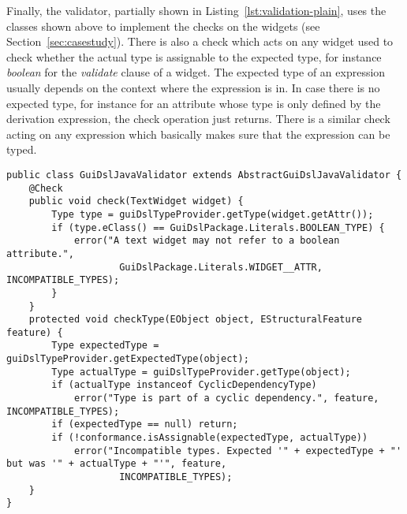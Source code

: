 Finally, the validator, partially shown in Listing~\ref{lst:validation-plain},
uses the classes shown above to implement the checks on the widgets (see
Section~\ref{sec:casestudy}).
There is also a check which acts on any widget used to check whether the actual
type is assignable to the expected type, for instance \emph{boolean} for the
\emph{validate} clause of a widget. The expected type of an expression usually
depends on the context where the expression is in.
In case there is no expected type, for instance for an attribute whose type is
only defined by the derivation expression, the check operation just returns.
There is a similar check acting on any expression which basically makes sure
that the expression can be typed.

%

\begin{lstlisting}[float=tb,label=lst:validation-plain,caption=Xtext validator.] 
public class GuiDslJavaValidator extends AbstractGuiDslJavaValidator {
	@Check
	public void check(TextWidget widget) {
		Type type = guiDslTypeProvider.getType(widget.getAttr());
		if (type.eClass() == GuiDslPackage.Literals.BOOLEAN_TYPE) {
			error("A text widget may not refer to a boolean attribute.",
					GuiDslPackage.Literals.WIDGET__ATTR, INCOMPATIBLE_TYPES);
		}
	}
	protected void checkType(EObject object, EStructuralFeature feature) {
		Type expectedType = guiDslTypeProvider.getExpectedType(object);
		Type actualType = guiDslTypeProvider.getType(object);
		if (actualType instanceof CyclicDependencyType)
			error("Type is part of a cyclic dependency.", feature, INCOMPATIBLE_TYPES);
		if (expectedType == null) return;
		if (!conformance.isAssignable(expectedType, actualType))
			error("Incompatible types. Expected '" + expectedType + "' but was '" + actualType + "'", feature,
					INCOMPATIBLE_TYPES);
	}
}
\end{lstlisting}


%

